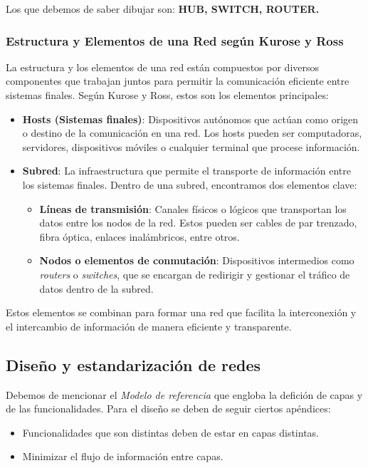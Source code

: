 \documentclass[a4paper,12pt]{article}
\begin{document}
Los que debemos de saber dibujar son: \textbf{HUB, SWITCH, ROUTER.}

\subsubsection{Estructura y Elementos de una Red según Kurose y Ross}

La estructura y los elementos de una red están compuestos por diversos componentes que trabajan juntos para permitir la comunicación eficiente entre sistemas finales. Según Kurose y Ross, estos son los elementos principales:

\begin{itemize}
    \item \textbf{Hosts (Sistemas finales)}: 
    Dispositivos autónomos que actúan como origen o destino de la comunicación en una red. Los hosts pueden ser computadoras, servidores, dispositivos móviles o cualquier terminal que procese información.

    \item \textbf{Subred}: 
    La infraestructura que permite el transporte de información entre los sistemas finales. Dentro de una subred, encontramos dos elementos clave:
    \begin{itemize}
        \item \textbf{Líneas de transmisión}: Canales físicos o lógicos que transportan los datos entre los nodos de la red. Estos pueden ser cables de par trenzado, fibra óptica, enlaces inalámbricos, entre otros.
        \item \textbf{Nodos o elementos de conmutación}: Dispositivos intermedios como \textit{routers} o \textit{switches}, que se encargan de redirigir y gestionar el tráfico de datos dentro de la subred.
    \end{itemize}
\end{itemize}

Estos elementos se combinan para formar una red que facilita la interconexión y el intercambio de información de manera eficiente y transparente.

\subsection{Diseño y estandarización de redes}

Debemos de mencionar el \textit{Modelo de referencia} que engloba la defición de capas y de las funcionalidades. Para el diseño se deben de seguir ciertos apéndices:
\begin{itemize}
    \item Funcionalidades que son distintas deben de estar en capas distintas.
    \item Minimizar el flujo de información entre capas.
\end{itemize}
\end{document}
